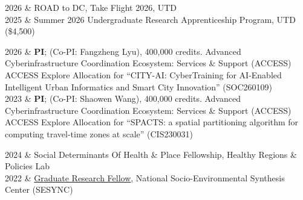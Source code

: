 \documentclass{acmcv}
\begin{document}
\begin{mytable}

    2026 & ROAD to DC, Take Flight 2026, UTD \\

    2025 & Summer 2026 Undergraduate Research Apprenticeship Program, UTD (\$4,500) \\

\end{mytable}

\begin{mytable}

    2026 & \textbf{PI}; (Co-PI: Fangzheng Lyu), 400,000 credits. Advanced Cyberinfrastructure Coordination Ecosystem: Services \& Support (ACCESS) \newline ACCESS Explore Allocation for “CITY-AI: CyberTraining for AI-Enabled Intelligent Urban Informatics and Smart City Innovation” (SOC260109) \\

    2023 & \textbf{PI}; (Co-PI: Shaowen Wang), 400,000 credits. Advanced Cyberinfrastructure Coordination Ecosystem: Services \& Support (ACCESS) \newline ACCESS Explore Allocation for “SPACTS: a spatial partitioning algorithm for computing travel-time zones at scale” (CIS230031) \\

\end{mytable}


\begin{mytable}

    2024 & Social Determinants Of Health \& Place Fellowship, Healthy Regions \& Policies Lab \\

    2022 & \href{https://www.sesync.org/project/graduate-pursuits-request-for-proposals/financial-opacity-and-challenges-to-forest}{Graduate Research Fellow}, National Socio-Environmental Synthesis Center (SESYNC)\\

\end{mytable}



\end{document}
